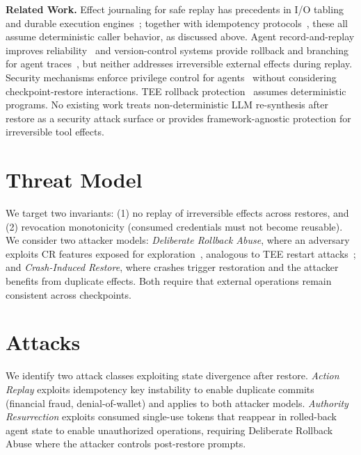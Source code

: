 \documentclass[sigplan,nonacm]{acmart}
\begin{document}
\textbf{Related Work.} Effect journaling for safe replay has precedents in I/O tabling~\cite{somogyi2003iotabling} and durable execution engines~\cite{birrell1984rpc, temporal_side_effects}; together with idempotency protocols~\cite{stripe_idempotent_requests, ietf_idempotency_key}, these all assume deterministic caller behavior, as discussed above. Agent record-and-replay improves reliability~\cite{feng2025agentrR} and version-control systems provide rollback and branching for agent traces~\cite{li2025agentgit}, but neither addresses irreversible external effects during replay. Security mechanisms enforce privilege control for agents~\cite{progent, agentspec, owaspllm} without considering checkpoint-restore interactions. TEE rollback protection~\cite{parno2011memoir, matetic2017rote} assumes deterministic programs. No existing work treats non-deterministic LLM re-synthesis after restore as a security attack surface or provides framework-agnostic protection for irreversible tool effects.

\section{Threat Model}

We target two invariants: (1) no replay of irreversible effects across restores, and (2) revocation monotonicity (consumed credentials must not become reusable). We consider two attacker models: \emph{Deliberate Rollback Abuse}, where an adversary exploits CR features exposed for exploration~\cite{langgraph}, analogous to TEE restart attacks~\cite{matetic2017rote}; and \emph{Crash-Induced Restore}, where crashes trigger restoration and the attacker benefits from duplicate effects. Both require that external operations remain consistent across checkpoints.

\section{Attacks}

We identify two attack classes exploiting state divergence after restore. \emph{Action Replay} exploits idempotency key instability to enable duplicate commits (financial fraud, denial-of-wallet) and applies to both attacker models. \emph{Authority Resurrection} exploits consumed single-use tokens that reappear in rolled-back agent state to enable unauthorized operations, requiring Deliberate Rollback Abuse where the attacker controls post-restore prompts.
\end{document}
